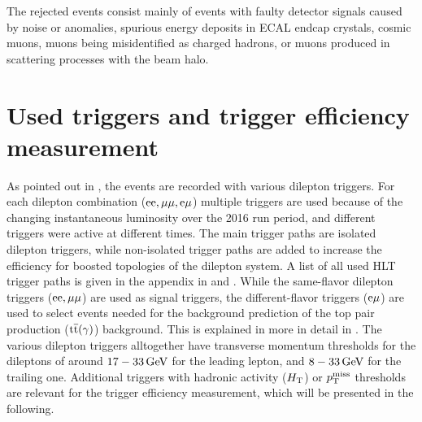The rejected events consist mainly of events with faulty detector signals caused by noise or anomalies, spurious energy deposits in ECAL endcap crystals, cosmic muons, muons being misidentified as charged hadrons, or muons produced in scattering processes with the beam halo.


\section{Used triggers and trigger efficiency measurement}\label{sec:triggEff}
As pointed out in , the events are recorded with various dilepton triggers. For each dilepton combination ($\mathrm{e}\mathrm{e},{\mu}{\mu},\mathrm{e}{\mu}$) multiple triggers are used because of the changing instantaneous luminosity over the 2016 run period, and different triggers were active at different times. The main trigger paths are isolated dilepton triggers, while non-isolated trigger paths are added to increase the efficiency for boosted topologies of the dilepton system. A list of all used HLT trigger paths is given in the appendix in  and . While the same-flavor dilepton triggers ($\mathrm{e}\mathrm{e},{\mu}{\mu}$) are used as signal triggers, the different-flavor triggers ($\mathrm{e}{\mu}$) are used to select events needed for the background prediction of the top pair production (${\mathrm{t}\overline{\mathrm{t}}}(\gamma)$) background. This is explained in more in detail in . The various dilepton triggers alltogether have transverse momentum thresholds for the dileptons of around $17-33\,\text{Ge\hspace{-.08em}V}$ for the leading lepton, and $8-33\,\text{Ge\hspace{-.08em}V}$ for the trailing one. Additional triggers with hadronic activity ($H_{\mathrm{T}}$) or $p_{\mathrm{T}}^\text{miss}$ thresholds are relevant for the trigger efficiency measurement, which will be presented in the following.

